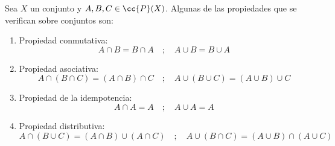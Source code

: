 \begin{prop}
    Sea $X$ un conjunto y $A, B, C \in \cc{P}(X)$. Algunas de las propiedades que se verifican sobre conjuntos son:
    \begin{enumerate}
        \item Propiedad conmutativa:
        $$A \cap B = B \cap A \quad;\quad A \cup B = B \cup A$$
        \item Propiedad asociativa:
        $$A \cap (B \cap C) = (A \cap B) \cap C \quad;\quad A \cup (B \cup C) = (A \cup B) \cup C$$
        \item Propiedad de la idempotencia:
        $$A \cap A = A \quad;\quad A \cup A = A$$
        \item Propiedad distributiva:
        $$A \cap (B \cup C) = (A \cap B) \cup (A \cap C) \quad;\quad A \cup (B \cap C) = (A \cup B) \cap (A \cup C)$$
    \end{enumerate}
\end{prop}

